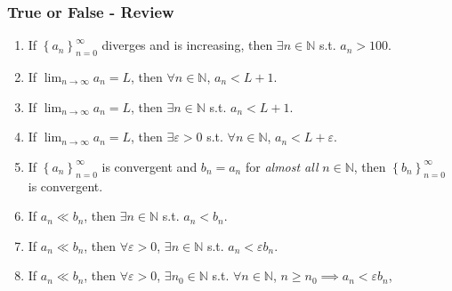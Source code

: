 \documentclass[14pt]{beamer}
\begin{document}
	\begin{frame}[t]
		\fontsize{13}{13}\selectfont
		\frametitle{True or False - Review}

		\begin{enumerate}
			\item If $\displaystyle \left\{ a_{n} \right\}_{n=0}^{\infty}$ diverges and
				is increasing, then $\exists n \in \mathbb{N}$ s.t. $a_{n}> 100$.
				\vfill

			\item If $\displaystyle \lim_{n \to \infty}a_{n}= L$, then
				$\forall n \in \mathbb{N}$, $\displaystyle a_{n}< L+1$.
				\vfill

			\item If $\displaystyle \lim_{n \to \infty}a_{n}= L$, then
				$\exists n \in \mathbb{N}$ s.t. $\displaystyle a_{n}< L+1$.
				\vfill

			\item If $\displaystyle \lim_{n \to \infty}a_{n}= L$, then
				$\exists \varepsilon>0$ s.t. $\forall n \in \mathbb{N}$,
				$\displaystyle a_{n}< L+\varepsilon$.
				\vfill

			\item If $\left\{ a_{n} \right\}_{n=0}^{\infty}$ is convergent and $b_{n}=a
				_{n}$ for \emph{almost all} $n \in \mathbb{N}$, then $\left\{ b_{n} \right
				\}_{n=0}^{\infty}$ is convergent.
				\vfill

			\item If $a_{n}\ll b_{n}$, then $\exists n \in \mathbb{N}$ s.t. $a_{n}< b_{n}$.
				\vfill

			\item If $a_{n}\ll b_{n}$, then $\forall \varepsilon >0$, $\exists n \in \mathbb{N}$
				s.t. $a_{n}< \varepsilon b_{n}$.
				\vfill

			\item If $a_{n}\ll b_{n}$, then $\forall \varepsilon >0$, $\exists n_{0}\in
				\mathbb{N}$ s.t. $\forall n \in \mathbb{N}$, $n \geq n_{0}\implies a_{n}<
				\varepsilon b_{n}$,
				\vfill
		\end{enumerate}
	\end{frame}


\end{document}
